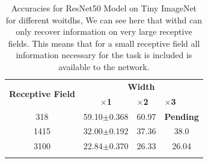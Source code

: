 \begin{table}[!htp]
  \centering
\begin{tabular}{@{}cccc@{}}
\toprule
\multirow{2}{*}{\textbf{Receptive Field}} & \multicolumn{3}{c}{\textbf{Width}}                                                                                       \\ \cmidrule(l){2-4} 
                                          & \multicolumn{1}{c}{\textbf{$\times$1}} & \multicolumn{1}{l}{\textbf{$\times$2}} & \multicolumn{1}{l}{\textbf{$\times$3}} \\ \midrule
318                                       & 59.10$\pm$0.368                        & 60.97                                  & \textbf{Pending}                       \\
1415                                      & 32.00$\pm$0.192                        & 37.36                                  & 38.0                                   \\
3100                                      & 22.84$\pm$0.370                        & 26.33
& 26.04                                  \\ \bottomrule \\
\end{tabular}
\caption{Accuracies for ResNet50 Model on Tiny ImageNet for different woitdhs, We can see here that withd can only recover information on very large receptive fields. This means that for a small receptive field all information necessary for the task is included is available to the network.}
\label{tab:width_experiments}
\end{table}

